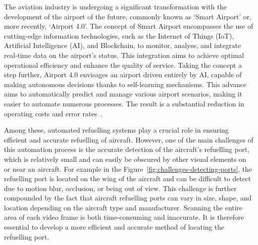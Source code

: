 \documentclass[12pt,oneside]{book} %
\begin{document}
The aviation industry is undergoing a significant transformation with the
development of the airport of the future, commonly known as `Smart Airport’ or,
more recently, `Airport 4.0’. The concept of Smart Airport encompasses the use
of cutting-edge information technologies, such as the Internet of Things (IoT),
Artificial Intelligence (AI), and Blockchain, to monitor, analyse, and
integrate real-time data on the airport's status. This integration aims to
achieve optimal operational efficiency and enhance the quality of service.
Taking the concept a step further, Airport 4.0 envisages an airport driven
entirely by AI, capable of making autonomous decisions thanks to self-learning
mechanisms. This advance aims to automatically predict and manage various
airport scenarios, making it easier to automate numerous processes. The result
is a substantial reduction in operating costs and error
rates~\cite{10.1007/978-981-16-5943-0_26}.

Among these, automated refuelling systems play a crucial role in ensuring
efficient and accurate refuelling of aircraft. However, one of the main
challenges of this automation process is the accurate detection of the
aircraft's refuelling port, which is relatively small and can easily be
obscured by other visual elements on or near an aircraft. For example in the
Figure~\ref{fig:challenges-detecting-ports}, the refuelling port is located on
the wing of the aircraft and can be difficult to detect due to motion blur,
occlusion, or being out of view. This challenge is further compounded by the
fact that aircraft refuelling ports can vary in size, shape, and location
depending on the aircraft type and manufacturer. Scanning the entire area of
each video frame is both time-consuming and inaccurate. It is therefore
essential to develop a more efficient and accurate method of locating the
refuelling port. 
\end{document}
